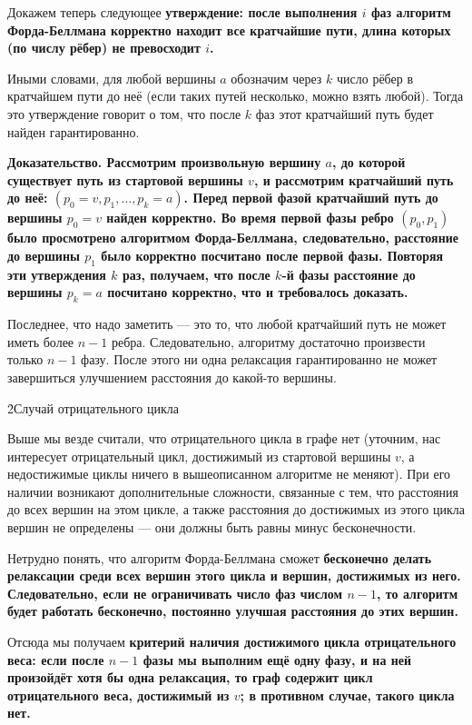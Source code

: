 Докажем теперь следующее \bf{утверждение}: после выполнения $i$ фаз алгоритм Форда-Беллмана корректно находит все кратчайшие пути, длина которых (по числу рёбер) не превосходит $i$.

Иными словами, для любой вершины $a$ обозначим через $k$ число рёбер в кратчайшем пути до неё (если таких путей несколько, можно взять любой). Тогда это утверждение говорит о том, что после $k$ фаз этот кратчайший путь будет найден гарантированно. 

\bf{Доказательство}. Рассмотрим произвольную вершину $a$, до которой существует путь из стартовой вершины $v$, и рассмотрим кратчайший путь до неё: $(p_0=v, p_1, \ldots, p_k=a)$. Перед первой фазой кратчайший путь до вершины $p_0=v$ найден корректно. Во время первой фазы ребро $(p_0,p_1)$ было просмотрено алгоритмом Форда-Беллмана, следовательно, расстояние до вершины $p_1$ было корректно посчитано после первой фазы. Повторяя эти утверждения $k$ раз, получаем, что после $k$-й фазы расстояние до вершины $p_k=a$ посчитано корректно, что и требовалось доказать.

Последнее, что надо заметить --- это то, что любой кратчайший путь не может иметь более $n-1$ ребра. Следовательно, алгоритму достаточно произвести только $n-1$ фазу. После этого ни одна релаксация гарантированно не может завершиться улучшением расстояния до какой-то вершины.


\h2{Случай отрицательного цикла}

Выше мы везде считали, что отрицательного цикла в графе нет (уточним, нас интересует отрицательный цикл, достижимый из стартовой вершины $v$, а недостижимые циклы ничего в вышеописанном алгоритме не меняют). При его наличии возникают дополнительные сложности, связанные с тем, что расстояния до всех вершин на этом цикле, а также расстояния до достижимых из этого цикла вершин не определены --- они должны быть равны минус бесконечности.

Нетрудно понять, что алгоритм Форда-Беллмана сможет \bf{бесконечно делать релаксации} среди всех вершин этого цикла и вершин, достижимых из него. Следовательно, если не ограничивать число фаз числом $n-1$, то алгоритм будет работать бесконечно, постоянно улучшая расстояния до этих вершин.

Отсюда мы получаем \bf{критерий наличия достижимого цикла отрицательного веса}: если после $n-1$ фазы мы выполним ещё одну фазу, и на ней произойдёт хотя бы одна релаксация, то граф содержит цикл отрицательного веса, достижимый из $v$; в противном случае, такого цикла нет.

